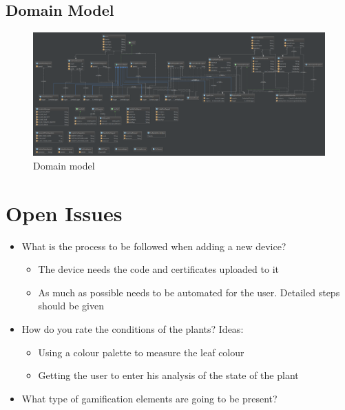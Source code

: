 \documentclass{article}
\begin{document}
	\begin{landscape}
		\subsection{Domain Model}
		\begin{figure}[H]
			\includegraphics[width=\linewidth]{../images/aworldofplants_domain.png}
			\caption{Domain model}
		\end{figure}
	\end{landscape}

\newpage
\section{Open Issues}
	\begin{itemize}
		\item What is the process to be followed when adding a new device?
		\begin{itemize}
			\item The device needs the code and certificates uploaded to it
			\item As much as possible needs to be automated for the user. Detailed steps should be given
		\end{itemize}

		\item How do you rate the conditions of the plants?
		Ideas:
		\begin{itemize}
			\item Using a colour palette to measure the leaf colour
			\item Getting the user to enter his analysis of the state of the plant
		\end{itemize}

		\item What type of gamification elements are going to be present?

	\end{itemize}
\end{document}
